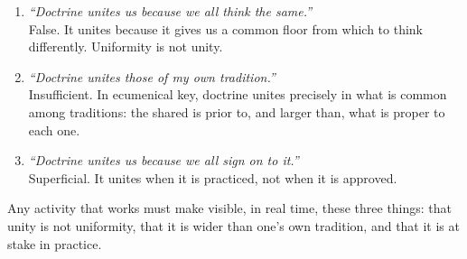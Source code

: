 \documentclass[11pt, a4paper]{article}
\begin{document}
\begin{enumerate}[label={\color{doctrinaAzul}\arabic*.}]
  \item \emph{``Doctrine unites us because we all think the same.''} \\
        False. It unites because it gives us a common floor from which to think differently. Uniformity is not unity.
  \item \emph{``Doctrine unites those of my own tradition.''} \\
        Insufficient. In ecumenical key, doctrine unites precisely in what is common among traditions: the shared is prior to, and larger than, what is proper to each one.
  \item \emph{``Doctrine unites us because we all sign on to it.''} \\
        Superficial. It unites when it is practiced, not when it is approved.
\end{enumerate}

Any activity that works must make visible, in real time, these three things: that unity is not uniformity, that it is wider than one's own tradition, and that it is at stake in practice.

\vspace{1.5em}
\end{document}
